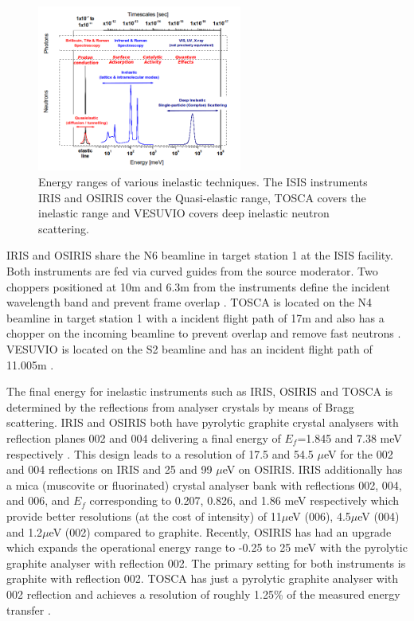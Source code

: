 \documentclass[paper=a4, fontsize=11pt]{scrartcl}	%
\numberwithin{equation}{section}															%
\numberwithin{figure}{section}																%
\numberwithin{table}{section}																%
\begin{document}
\begin{figure}[H]
\centering
\includegraphics[width=0.6\textwidth]{img/instrument-energy-chart.png}
\caption{Energy ranges of various inelastic techniques. The ISIS instruments IRIS and OSIRIS cover the Quasi-elastic range, TOSCA covers the inelastic range and VESUVIO covers deep inelastic neutron scattering.}
\label{fig:instrument-energy-range}
\end{figure}

IRIS and OSIRIS share the N6 beamline in target station 1 at the ISIS facility. Both instruments are fed via curved guides from the source moderator. Two choppers positioned at 10m and 6.3m from the instruments define the incident wavelength band and prevent frame overlap \cite{smukhopadhyay2014}. TOSCA is located on the N4 beamline in target station 1 with a incident flight path of 17m and also has a chopper on the incoming beamline to prevent overlap and remove fast neutrons \cite{colognesi2002tosca}. VESUVIO is located on the S2 beamline and has an incident flight path of 11.005m \cite{mayers2011calibration}.

The final energy for inelastic instruments such as IRIS, OSIRIS and TOSCA is determined by the reflections from analyser crystals by means of Bragg scattering. IRIS and OSIRIS both have pyrolytic graphite crystal analysers with reflection planes 002 and 004 delivering a final energy of $E_f$=1.845 and 7.38 meV respectively \cite{adams2001iris, telling2003osiris}. This design leads to a resolution of 17.5 and 54.5 $\mu$eV for the 002 and 004 reflections on IRIS and 25 and 99 $\mu$eV on OSIRIS. IRIS additionally has a mica (muscovite or fluorinated) crystal analyser bank with reflections 002, 004, and 006, and $E_f$ corresponding to 0.207, 0.826, and 1.86 meV respectively which provide better resolutions (at the cost of intensity) of 11$\mu$eV (006), 4.5$\mu$eV (004) and
1.2$\mu$eV (002) compared to graphite. Recently, OSIRIS has had an upgrade which expands the operational energy range to -0.25 to 25 meV with the pyrolytic graphite analyser with reflection 002. The primary setting for both instruments is graphite with reflection 002. TOSCA has just a pyrolytic graphite analyser with 002 reflection \cite{colognesi2002tosca} and achieves a resolution of roughly 1.25\% of the measured energy transfer \cite{parker2003tosca}.
\end{document}
